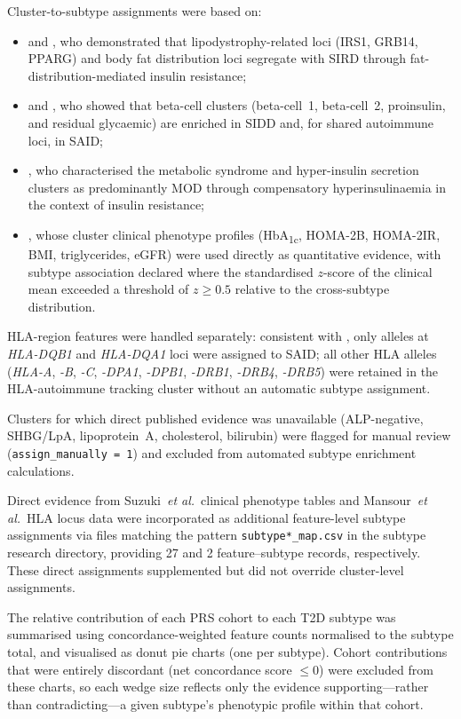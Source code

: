 Cluster-to-subtype assignments were based on:
\begin{itemize}
  \item \citet{Yaghootkar2014} and \citet{Kim2023}, who demonstrated that lipodystrophy-related loci (IRS1, GRB14, PPARG) and body fat distribution loci segregate with SIRD through fat-distribution-mediated insulin resistance;
  \item \citet{Ahlqvist2018} and \citet{Kim2023}, who showed that beta-cell clusters (beta-cell~1, beta-cell~2, proinsulin, and residual glycaemic) are enriched in SIDD and, for shared autoimmune loci, in SAID;
  \item \citet{Aly2023}, who characterised the metabolic syndrome and hyper-insulin secretion clusters as predominantly MOD through compensatory hyperinsulinaemia in the context of insulin resistance;
  \item \citet{Suzuki2024}, whose cluster clinical phenotype profiles (HbA\textsubscript{1c}, HOMA-2B, HOMA-2IR, BMI, triglycerides, eGFR) were used directly as quantitative evidence, with subtype association declared where the standardised $z$-score of the clinical mean exceeded a threshold of $z \geq 0.5$ relative to the cross-subtype distribution.
\end{itemize}

HLA-region features were handled separately: consistent with \citet{Mansour2023}, only alleles at \textit{HLA-DQB1} and \textit{HLA-DQA1} loci were assigned to SAID; all other HLA alleles (\textit{HLA-A}, \textit{-B}, \textit{-C}, \textit{-DPA1}, \textit{-DPB1}, \textit{-DRB1}, \textit{-DRB4}, \textit{-DRB5}) were retained in the HLA-autoimmune tracking cluster without an automatic subtype assignment.

Clusters for which direct published evidence was unavailable (ALP-negative, SHBG/LpA, lipoprotein~A, cholesterol, bilirubin) were flagged for manual review (\texttt{assign\_manually = 1}) and excluded from automated subtype enrichment calculations.

Direct evidence from Suzuki~\textit{et al.}\ clinical phenotype tables and Mansour~\textit{et al.}\ HLA locus data were incorporated as additional feature-level subtype assignments via files matching the pattern \texttt{subtype*\_map.csv} in the subtype research directory, providing 27 and 2 feature--subtype records, respectively.
These direct assignments supplemented but did not override cluster-level assignments.

The relative contribution of each PRS cohort to each T2D subtype was summarised using concordance-weighted feature counts normalised to the subtype total, and visualised as donut pie charts (one per subtype).
Cohort contributions that were entirely discordant (net concordance score $\leq 0$) were excluded from these charts, so each wedge size reflects only the evidence supporting—rather than contradicting—a given subtype's phenotypic profile within that cohort.
